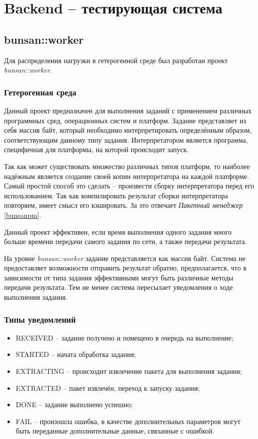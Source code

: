 \chapter{Backend -- тестирующая система}

\section{bunsan::worker}
Для распределения нагрузки в гетерогенной среде
был разработан проект \textit{bunsan::worker}.

\subsection{Гетерогенная среда}
Данный проект предназначен для выполнения заданий
с применением различных программных сред, операционных систем и платформ.
Задание представляет из себя массив байт, который необходимо
интерпретировать определённым образом,
соответствующим данному типу задания. Интерпретатором является
программа, специфичная для платформы, на которой
происходит запуск.

Так как может существовать множество различных
типов платформ, то наиболее надёжным является создание своей копии
интерпретатора на каждой платформе.
Самый простой способ это сделать -- произвести сборку
интерпретатора перед его использованием.
Так как компилировать результат сборки интерпретатора повторяем,
имеет смысл его кэшировать.
За это отвечает \textit{Пакетный менеджер} \ref{bunsanpm}.

Данный проект эффективен,
если время выполнения одного задания много больше
времени передачи самого задания по сети,
а также передачи результата.

На уровне \textit{bunsan::worker} задание
представляется как массив байт. Система
не предоставляет возможности отправить результат
обратно, предполагается, что в зависимости
от типа задания эффективными могут быть различные методы передачи результата.
Тем не менее система пересылает уведомления о ходе выполнения задания.

\subsection{Типы уведомлений}
\begin{itemize}
	\item RECEIVED -- задание получено и помещено в очередь на выполнение;
	\item STARTED -- начата обработка задания;
	\item EXTRACTING -- происходит извлечение пакета для выполнения задания;
	\item EXTRACTED -- пакет извлечён, переход к запуску задания;
	\item DONE -- задание выполнено успешно;
	\item FAIL -- произошла ошибка,
		в качестве дополнительных параметров могут быть переданные дополнительные данные,
		связанные с ошибкой.
\end{itemize}

